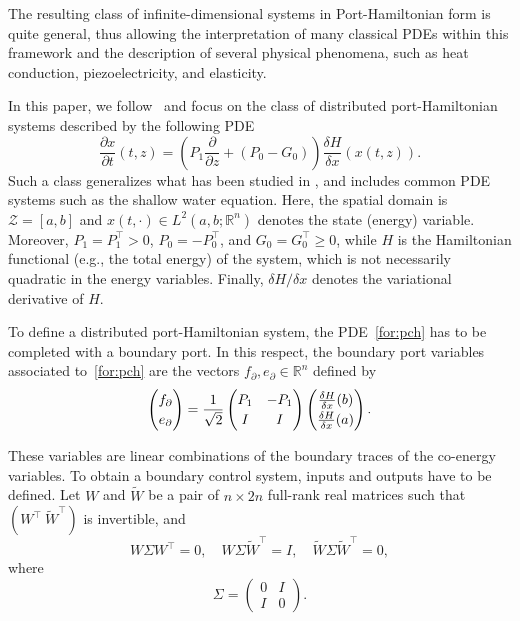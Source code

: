\documentclass[letterpaper, 10 pt, conference]{ieeeconf}  %
\newcounter{part} %
\begin{document}
The resulting class of infinite-dimensional systems in Port-Hamiltonian form is quite general, thus allowing the interpretation of many classical PDEs within this framework and the description of several physical phenomena, such as heat conduction, piezoelectricity, and elasticity. 

In this paper, we follow~\cite{macchelli2015control} and focus on the class of distributed port-Hamiltonian systems described by the following PDE
\begin{equation}
\frac{\partial x}{\partial t}(t,z) = \left(P_1 \frac{\partial}{\partial z}  + (P_0 - G_0)\right)\frac{\delta H}{\delta x}(x(t,z)).
\label{for:pch}
\end{equation}
Such a class generalizes what has been studied in \cite{le2005dirac, jacob2012linear}, and includes common PDE systems such as the shallow water equation. Here, the spatial domain is $\mathcal{Z} = [a,b]$ and $x(t,\cdot) \in  L^2(a,b;\mathbb{R}^n)$ denotes the state (energy) variable. Moreover, $P_1 = P_1^\top > 0$, $P_0 = -P_0^\top$, and $G_0 = G_0^\top \geq 0$, while $H$ is the Hamiltonian functional (e.g., the total energy) of the system, which is not necessarily quadratic in the energy variables. Finally, $\delta H/\delta x$ denotes the variational derivative of $H$.

To define a distributed port-Hamiltonian system, the PDE~\eqref{for:pch} has to be completed with a boundary port. In this respect, the boundary port variables associated to~\eqref{for:pch} are the vectors $f_{\partial}, e_{\partial} \in \mathbb{R}^n$ defined by
\begin{equation}
\label{for:boundaryport}
\begin{pmatrix}
f_{\partial} \\
e_{\partial}
\end{pmatrix}
=
\frac{1}{\sqrt{2}}
\begin{pmatrix}
P_1 & -P_1 \\
I & I
\end{pmatrix}
\renewcommand*{\arraystretch}{1.2}
\begin{pmatrix}
\frac{\delta H}{\delta x}(b) \\
\frac{\delta H}{\delta x}(a)
\end{pmatrix}.
\end{equation}

These variables are linear combinations of the boundary traces of the co-energy variables. To obtain a boundary control system, inputs and outputs have to be defined. Let $W$ and $\widetilde{W}$ be a pair of $n \times 2n$ full-rank real matrices such that $(W^\top \ \widetilde{W}^\top)$ is invertible, and
\begin{equation}
W \Sigma W^\top = 0, \quad
W \Sigma \widetilde{W}^\top = I, \quad
\widetilde{W} \Sigma \widetilde{W}^\top = 0,
\end{equation}
where
\[
\Sigma =
\begin{pmatrix}
0 & I \\
I & 0
\end{pmatrix}.
\]
\end{document}
